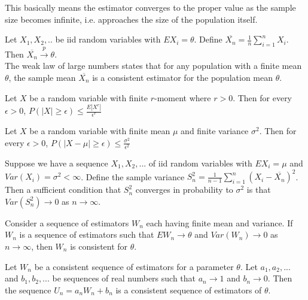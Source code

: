 \begin{note}
    This basically means the estimator converges to the proper value as the sample size becomes infinite, i.e. approaches the size of the population itself.
\end{note}

\begin{thm}
    Let $X_1, X_2, ..$ be iid random variables with $EX_i = \theta$. Define $\overline{X_n} = \frac{1}{n} \sum_{i=1}^n X_i$. Then $\overline{X_n} \overset{p}{\to} \theta$. \\
    The weak law of large numbers states that for any population with a finite mean $\theta$, the sample mean $\overline{X_n}$ is a consistent estimator for the population mean $\theta$.
\end{thm}

\begin{thm}
    Let $X$ be a random variable with finite $r$-moment where $r > 0$. Then for every $\epsilon > 0$, $P(|X| \geq \epsilon) \leq \frac{E|X^r|}{\epsilon^r}$
\end{thm}

\begin{thm}
    Let $X$ be a random variable with finite mean $\mu$ and finite variance $\sigma^2$. Then for every $\epsilon > 0$, $P(|X-\mu| \geq \epsilon) \leq \frac{\sigma^2}{\epsilon^2}$
\end{thm}

\begin{thm}
    Suppose we have a sequence $X_1, X_2, ...$ of iid random variables with $EX_i = \mu$ and $Var(X_i) = \sigma^2 < \infty$. Define the sample variance $S_n^2 = \frac{1}{n-1} \sum_{i=1}^n (X_i - \overline{X_n})^2$. Then a sufficient condition that $S_n^2$ converges in probability to $\sigma^2$ is that $Var(S_n^2) \to 0$ as $n \to \infty$.
\end{thm}


\begin{thm}
    Consider a sequence of estimators $W_n$ each having finite mean and variance. If $W_n$ is a sequence of estimators such that $EW_n \to \theta$ and $Var(W_n) \to 0$ as $n \to \infty$, then $W_n$ is consistent for $\theta$.
\end{thm}

\begin{thm}
    Let $W_n$ be a consistent sequence of estimators for a parameter $\theta$. Let $a_1, a_2, ...$ and $b_1, b_2, ...$ be sequences of real numbers such that $a_n \to 1$ and $b_n \to 0$. Then the sequence $U_n = a_n W_n + b_n$ is a consistent sequence of estimators of $\theta$.
\end{thm}

